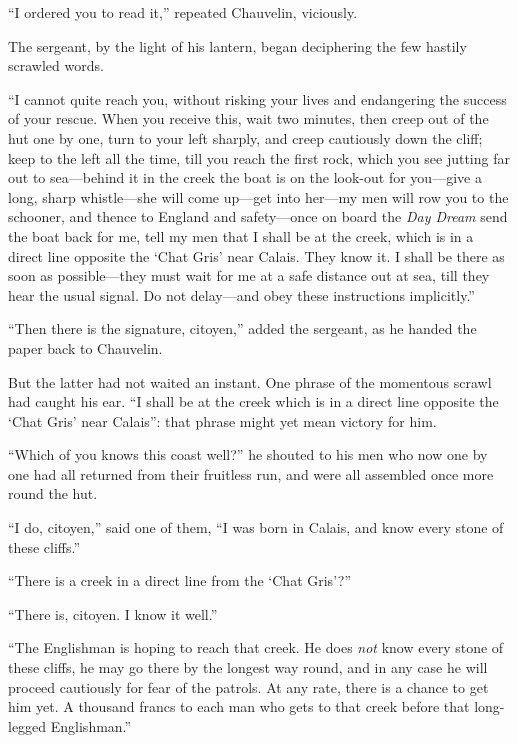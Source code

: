 \enquote{I ordered you to read it,} repeated Chauvelin, viciously.

The sergeant, by the light of his lantern, began deciphering the few hastily scrawled words.

\enquote{I cannot quite reach you, without risking your lives and endangering the success of your rescue. When you receive this, wait two minutes, then creep out of the hut one by one, turn to your left sharply, and creep cautiously down the cliff; keep to the left all the time, till you reach the first rock, which you see jutting far out to sea---behind it in the creek the boat is on the look-out for you---give a long, sharp whistle---she will come up---get into her---my men will row you to the schooner, and thence to England and safety---once on board the \textit{Day Dream} send the boat back for me, tell my men that I shall be at the creek, which is in a direct line opposite the \enquote{Chat Gris} near Calais. They know it. I shall be there as soon as possible---they must wait for me at a safe distance out at sea, till they hear the usual signal. Do not delay---and obey these instructions implicitly.}

\enquote{Then there is the signature, citoyen,} added the sergeant, as he handed the paper back to Chauvelin.

But the latter had not waited an instant. One phrase of the momentous scrawl had caught his ear. \enquote{I shall be at the creek which is in a direct line opposite the \enquote{Chat Gris} near Calais}: that phrase might yet mean victory for him.

\enquote{Which of you knows this coast well?} he shouted to his men who now one by one had all returned from their fruitless run, and were all assembled once more round the hut.

\enquote{I do, citoyen,} said one of them, \enquote{I was born in Calais, and know every stone of these cliffs.}

\enquote{There is a creek in a direct line from the \enquote{Chat Gris}?}

\enquote{There is, citoyen. I know it well.}

\enquote{The Englishman is hoping to reach that creek. He does \textit{not} know every stone of these cliffs, he may go there by the longest way round, and in any case he will proceed cautiously for fear of the patrols. At any rate, there is a chance to get him yet. A thousand francs to each man who gets to that creek before that long-legged Englishman.}

